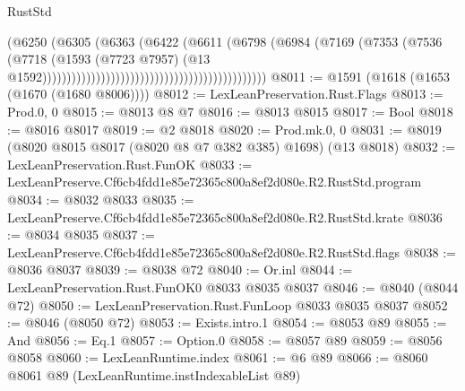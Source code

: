 \begin{lexlean}{RustStd}
\begin{coremodule}
                                                                      (@6250
                                                                        (@6305
                                                                          (@6363
                                                                            (@6422
                                                                              (@6611
                                                                                (@6798
                                                                                  (@6984
                                                                                    (@7169
                                                                                      (@7353
                                                                                        (@7536
                                                                                          (@7718
                                                                                            (@1593
                                                                                              (@7723
                                                                                                @7957)
                                                                                              (@13
                                                                                                @1592))))))))))))))))))))))))))))))))))))))))))))))
@8011 := @1591 (@1618 (@1653 (@1670 (@1680 @8006))))
@8012 := LexLeanPreservation.Rust.Flags
@8013 := Prod.{0, 0}
@8015 := @8013 @8 @7
@8016 := @8013 @8015
@8017 := Bool
@8018 := @8016 @8017
@8019 := @2 @8018
@8020 := Prod.mk.{0, 0}
@8031 := @8019 (@8020 @8015 @8017 (@8020 @8 @7 @382 @385) @1698) (@13 @8018)
@8032 := LexLeanPreservation.Rust.FunOK
@8033 := LexLeanPreserve.Cf6cb4fdd1e85e72365c800a8ef2d080e.R2.RustStd.program
@8034 := @8032 @8033
@8035 := LexLeanPreserve.Cf6cb4fdd1e85e72365c800a8ef2d080e.R2.RustStd.krate
@8036 := @8034 @8035
@8037 := LexLeanPreserve.Cf6cb4fdd1e85e72365c800a8ef2d080e.R2.RustStd.flags
@8038 := @8036 @8037
@8039 := @8038 @72
@8040 := Or.inl
@8044 := LexLeanPreservation.Rust.FunOK0 @8033 @8035 @8037
@8046 := @8040 (@8044 @72)
@8050 := LexLeanPreservation.Rust.FunLoop @8033 @8035 @8037
@8052 := @8046 (@8050 @72)
@8053 := Exists.intro.{1}
@8054 := @8053 @89
@8055 := And
@8056 := Eq.{1}
@8057 := Option.{0}
@8058 := @8057 @89
@8059 := @8056 @8058
@8060 := LexLeanRuntime.index
@8061 := @6 @89
@8066 := @8060 @8061 @89 (LexLeanRuntime.instIndexableList @89)

\end{coremodule}
\end{lexlean}
